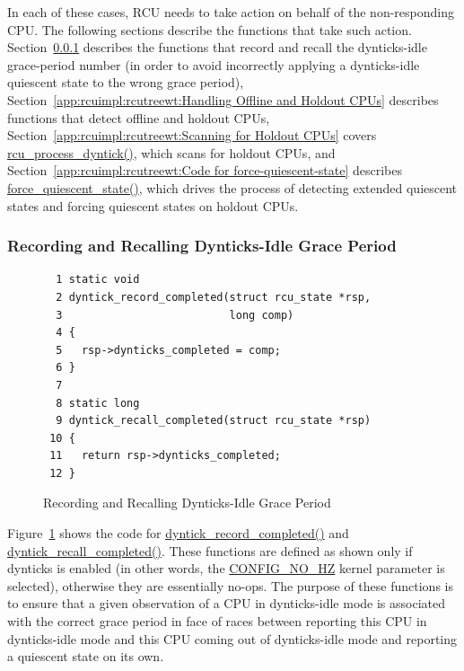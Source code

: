 In each of these cases, RCU needs to take action on behalf of the
non-responding CPU.
The following sections describe the functions that take such action.
Section~\ref{app:rcuimpl:rcutreewt:Recording and Recalling Dynticks-Idle Grace Period}
describes the functions that record and recall the dynticks-idle
grace-period number (in order to avoid incorrectly applying a dynticks-idle
quiescent state to the wrong grace period),
Section~\ref{app:rcuimpl:rcutreewt:Handling Offline and Holdout CPUs}
describes functions that detect offline and holdout CPUs,
Section~\ref{app:rcuimpl:rcutreewt:Scanning for Holdout CPUs}
covers \url{rcu_process_dyntick()}, which scans for holdout CPUs, and
Section~\ref{app:rcuimpl:rcutreewt:Code for force-quiescent-state}
describes \url{force_quiescent_state()}, which drives the process of
detecting extended quiescent states and forcing quiescent states on
holdout CPUs.

\subsubsection{Recording and Recalling Dynticks-Idle Grace Period}
\label{app:rcuimpl:rcutreewt:Recording and Recalling Dynticks-Idle Grace Period}

\begin{figure}[tbp]
{ \scriptsize
\begin{verbatim}
  1 static void
  2 dyntick_record_completed(struct rcu_state *rsp,
  3                          long comp)
  4 {
  5   rsp->dynticks_completed = comp;
  6 }
  7
  8 static long
  9 dyntick_recall_completed(struct rcu_state *rsp)
 10 {
 11   return rsp->dynticks_completed;
 12 }
\end{verbatim}
}
\caption{Recording and Recalling Dynticks-Idle Grace Period}
\label{fig:app:rcuimpl:rcutreewt:Recording and Recalling Dynticks-Idle Grace Period}
\end{figure}

Figure~\ref{fig:app:rcuimpl:rcutreewt:Recording and Recalling Dynticks-Idle Grace Period}
shows the code for \url{dyntick_record_completed()} and
\url{dyntick_recall_completed()}.
These functions are defined as shown only if dynticks
is enabled (in other words, the \url{CONFIG_NO_HZ} kernel parameter
is selected), otherwise they are essentially no-ops.
The purpose of these functions is to ensure that a given observation
of a CPU in dynticks-idle mode is associated with the correct
grace period in face of races between reporting this CPU in
dynticks-idle mode and this CPU coming out of dynticks-idle mode
and reporting a quiescent state on its own.


